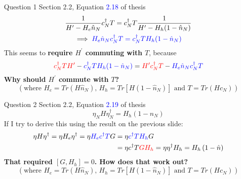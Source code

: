 \documentclass[12pt,aspectratio=169]{beamer}
\newcommand{\qs}[1]{\textbf{\textcolor{bottlegreen}{#1}}}
\begin{document}
\begin{frame}{Question 1}
	Section 2.2, Equation \textcolor{blue}{2.18} of thesis
\begin{equation*}
\begin{gathered}
	\frac{1}{H^\prime - H_e\hat n_N}c^\dagger_N T	= c^\dagger_N T\frac{1}{H^\prime - H_h(1-\hat n_N)}\\
	\implies \textcolor{blue}{H_e\hat n_Nc^\dagger_N T = c^\dagger_N TH_h(1-\hat n_N)}
\end{gathered}
\end{equation*}
This seems to \textbf{require \(H^\prime\) commuting with \(T\)}, because
\begin{equation*}
	\textcolor{red}{c^\dagger_N TH^\prime} - \textcolor{blue}{c^\dagger_N TH_h(1-\hat n_N)}= \textcolor{red}{H^\prime c^\dagger_N T} - \textcolor{blue}{H_e\hat n_Nc^\dagger_N T}
\end{equation*}
\qs{Why should $H^\prime$ commute with $T$?}
\begin{equation*}
	(\text{where } H_e = Tr\left(H\hat n_N\right) \text{, } H_h = Tr\left[H\left(1-\hat n_N\right)\right] \text{ and }T = Tr\left(Hc_N\right))
\end{equation*}
\end{frame}

\begin{frame}{Question 2}
	Section 2.2, Equation \textcolor{blue}{2.19} of thesis
\begin{equation*}
	\eta_N H \eta_N^\dagger = H_h \left(1 - n_N\right)
\end{equation*}
If I try to derive this using the result on the previous slide:
\begin{equation*}
\begin{aligned}
	\eta H \eta^\dagger = \eta H_e \eta^\dagger = \eta \textcolor{blue}{H_e c^\dagger T} G &= \eta \textcolor{blue}{c^\dagger T H_h} G \\
											       &= \eta c^\dagger T \textcolor{red}{G H_h} = \eta \eta^\dagger H_h = H_h \left(1 - \hat n\right)
\end{aligned}
\end{equation*}
\qs{That required $\left[G,H_h\right]=0$. How does that work out?}
\begin{equation*}
	(\text{where } H_e = Tr\left(H\hat n_N\right) \text{, } H_h = Tr\left[H\left(1-\hat n_N\right)\right] \text{ and }T = Tr\left(Hc_N\right))
\end{equation*}
\end{frame}
\end{document}
